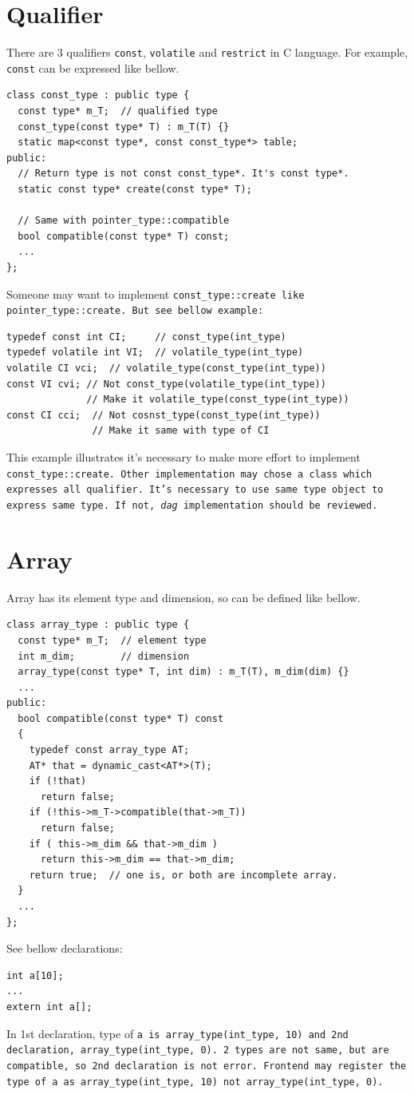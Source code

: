 \section{Qualifier}
\label{type_e002}
There are 3 qualifiers {\tt{const}}, {\tt{volatile}} and {\tt{restrict}}
in C language.
For example, {\tt{const}} can be expressed like bellow.
\begin{verbatim}
class const_type : public type {
  const type* m_T;  // qualified type
  const_type(const type* T) : m_T(T) {}
  static map<const type*, const const_type*> table;
public:
  // Return type is not const const_type*. It's const type*.
  static const type* create(const type* T);

  // Same with pointer_type::compatible
  bool compatible(const type* T) const;
  ...
};
\end{verbatim}
Someone may want to implement \tt{const\_type::create}
like {\tt{pointer\_type::create}}. But see bellow example:
\begin{verbatim}
typedef const int CI;     // const_type(int_type)
typedef volatile int VI;  // volatile_type(int_type)
volatile CI vci;  // volatile_type(const_type(int_type))
const VI cvi; // Not const_type(volatile_type(int_type))
              // Make it volatile_type(const_type(int_type))
const CI cci;  // Not cosnst_type(const_type(int_type))
               // Make it same with type of CI
\end{verbatim}
This example illustrates it's necessary to make more effort
to implement \tt{const\_type::create}. Other implementation
may chose a class which expresses all qualifier. It's necessary
to use same type object to express same type. If not,
{\it dag} implementation should be reviewed.

\section{Array}

Array has its element type and dimension, so can be defined like bellow.

\begin{verbatim}
class array_type : public type {
  const type* m_T;  // element type
  int m_dim;        // dimension
  array_type(const type* T, int dim) : m_T(T), m_dim(dim) {}
  ...
public:
  bool compatible(const type* T) const
  {
    typedef const array_type AT;
    AT* that = dynamic_cast<AT*>(T);
    if (!that)
      return false;
    if (!this->m_T->compatible(that->m_T))
      return false;
    if ( this->m_dim && that->m_dim )
      return this->m_dim == that->m_dim;
    return true;  // one is, or both are incomplete array.
  }
  ...
};
\end{verbatim}
See bellow declarations:
\begin{verbatim}
int a[10];
...
extern int a[];
\end{verbatim}
In 1st declaration, type of \tt{a} is
\tt{array\_type(int\_type, 10)} and 2nd declaration,
\tt{array\_type(int\_type, 0)}. 2 types are not
same, but are compatible, so 2nd declaration is
not error. Frontend may register the type of \tt{a}
as \tt{array\_type(int\_type, 10)} not
\tt{array\_type(int\_type, 0)}.

